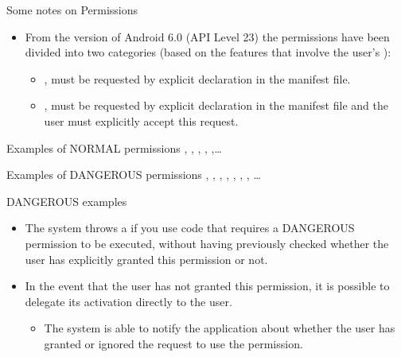 \documentclass{beamer}
\begin{document}
  \begin{frame}{Some notes on Permissions}
    \begin{itemize}
      \item From the version of Android 6.0 (API Level 23) the permissions have
      been divided into two categories (based on the features that involve the
      user's ):
      \begin{itemize}
        \item {}, must be requested by explicit declaration in the
        manifest file. 
        \item {}, must be requested by explicit declaration in the
        manifest file and the user must explicitly accept this request. 
      \end{itemize}
    \end{itemize}
    \begin{block}{Examples of NORMAL permissions}
      , ,
      , , ,\dots
    \end{block}

    \begin{block}{Examples of DANGEROUS permissions}
    , , , , , , , \dots
    \end{block}
  \end{frame}

  \begin{frame}{DANGEROUS examples}
    \begin{itemize}\itemsep10pt
      \item The system throws a  if you use code that
      requires a DANGEROUS permission to be executed, without having previously
      checked whether the user has explicitly granted this permission or not.
      \item In the event that the user has not granted this permission, it is
      possible to delegate its activation directly to the user.
      \begin{itemize}
        \item The system is able to notify the application about whether the
        user has granted or ignored the request to use the permission.
      \end{itemize}
    \end{itemize}
    \vfill
  \end{frame}
\end{document}
